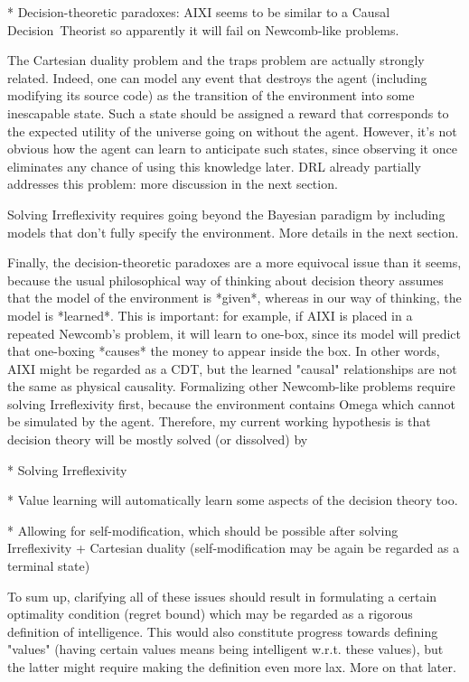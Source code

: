 \documentclass[a4paper]{article}
\begin{document}
* Decision-theoretic paradoxes: AIXI seems to be similar to a Causal Decision\ Theorist so apparently it will fail on Newcomb-like problems.

The Cartesian duality problem and the traps problem are actually strongly related. Indeed, one can model any event that destroys the agent (including modifying its source code) as the transition of the environment into some inescapable state. Such a state should be assigned a reward that corresponds to the expected utility of the universe going on without the agent. However, it's not obvious how the agent can learn to anticipate such states, since observing it once eliminates any chance of using this knowledge later. DRL already partially addresses this problem: more discussion in the next section.

Solving Irreflexivity requires going beyond the Bayesian paradigm by including models that don't fully specify the environment. More details in the next section.

Finally, the decision-theoretic paradoxes are a more equivocal issue than it seems, because the usual philosophical way of thinking about decision theory assumes that the model of the environment is *given*, whereas in our way of thinking, the model is *learned*. This is important: for example, if AIXI is placed in a repeated Newcomb's problem, it will learn to one-box, since its model will predict that one-boxing *causes* the money to appear inside the box. In other words, AIXI might be regarded as a CDT, but the learned "causal" relationships are not the same as physical causality. Formalizing other Newcomb-like problems require solving Irreflexivity first, because the environment contains Omega which cannot be simulated by the agent. Therefore, my current working hypothesis is that decision theory will be mostly solved (or dissolved) by

* Solving Irreflexivity

* Value learning will automatically learn some aspects of the decision theory too.

* Allowing for self-modification, which should be possible after solving Irreflexivity + Cartesian duality (self-modification may be again be regarded as a terminal state)

To sum up, clarifying all of these issues should result in formulating a certain optimality condition (regret bound) which may be regarded as a rigorous definition of intelligence. This would also constitute progress towards defining "values" (having certain values means being intelligent w.r.t. these values), but the latter might require making the definition even more lax. More on that later.
\end{document}
